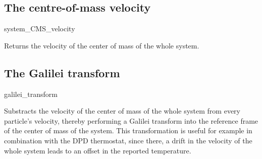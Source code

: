 \subsection{The centre-of-mass velocity}

\begin{essyntax}
  system_CMS_velocity
\begin{features}
\end{features}
\end{essyntax}
Returns the velocity of the center of mass of the whole system.

\subsection{The Galilei transform}

\begin{essyntax}
  galilei_transform
\begin{features}
\end{features}
\end{essyntax}
Substracts the velocity of the center of mass of the whole system from every particle's velocity, thereby performing a Galilei transform into the reference frame of the center of mass of the system. This transformation is useful for example in combination with the DPD thermostat, since there, a drift in the velocity of the whole system leads to an offset in the reported temperature.

